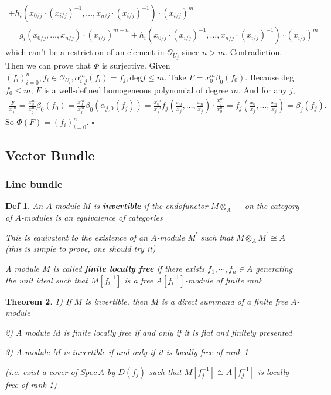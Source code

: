 \documentclass{article}
\newtheorem{theorem}{Theorem}[section]
\newtheorem{definition}[theorem]{Def}
\newenvironment{Proof}{{\noindent \indent \it Proof:\quad}}{\hfill $\square$\par}
\begin{document}
\begin{Proof}
\begin{align*}
    + h_i(x_{0/j}\cdot(x_{i/j})^{-1}, \dots, x_{n/j}\cdot(x_{i/j})^{-1}) \cdot (x_{i/j})^m\\
    = g_i(x_{0/j}, \dots, x_{n/j}) \cdot (x_{i/j})^{m-n}+ h_i(x_{0/j}\cdot(x_{i/j})^{-1}, \dots, x_{n/j}\cdot(x_{i/j})^{-1}) \cdot (x_{i/j})^m
\end{align*}
which can't be a restriction of an element in $\mathcal{O}_{U_j}$ since $n>m$. Contradiction.
\\
Then we can prove that $\Phi$ is surjective. Given $(f_i)_{i=0}^n, f_i \in \mathcal{O}_{U_i},\alpha_{i,j}^m(f_i)=f_j, \text{deg} f \leq m$. Take $F = x_0^m \beta_0(f_0)$. Because deg $f_0 \leq m$, $F$ is a well-defined homogeneous polynomial of degree $m$. 
And for any $j$,
\begin{align*}
    \frac{F}{x_j^m} = \frac{x_0^m}{x_j^m}\beta_0(f_0)
    = \frac{x_0^m}{x_j^m} \beta_0(\alpha_{j,0}(f_j))
    =\frac{x_0^m}{x_j^m}f_j(\frac{x_0}{x_j},\dots,\frac{x_n}{x_j})\cdot \frac{x_j^m}{x_0^m}
    = f_j(\frac{x_0}{x_j},\dots,\frac{x_n}{x_j})
    =\beta_j(f_j).
\end{align*}
So $\Phi(F)=(f_i)_{i=0}^n$.
\end{Proof}





\newpage
\subsection{Vector Bundle}
\subsubsection{Line bundle}
\begin{definition}
    An $A$-module $M$ is \textbf{invertible} if the endofunctor $M\otimes _A$ − on the category of $A$-modules
is an equivalence of categories

This is equivalent to the existence of an $A$-module $M^\prime$ such that $M\otimes_A M^\prime \cong A$ (this is simple to prove, one
should try it)

A module
$M$ is called \textbf{finite locally free} if there exists $f_1,\cdots, f_n \in A$ generating the unit ideal such that
$M[f^{-1}_i]$ is a free $A[f^{-1}_i]$-module of finite rank

\end{definition}

\begin{theorem}
1) If $M$ is invertible, then $M$ is a direct summand of a finite free $A$-module

2) A module $M$ is finite locally free if and only if it is flat and finitely presented

3) A module $M$ is invertible if and only if it is locally free of rank 1

(i.e. exist a cover of $Spec\, A$ by $D(f_j)$ such that $M[f_j^{-1}] \cong A[f_j^{-1}]$ is locally free of rank 1)
\end{theorem}
\end{document}
